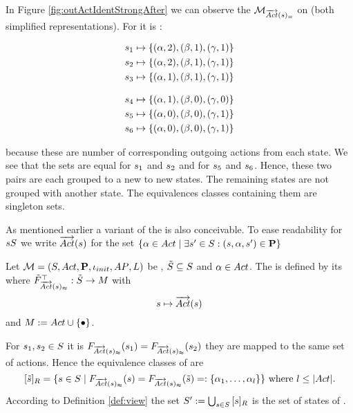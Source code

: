 \documentclass[preview]{standalone}
\begin{document}
In Figure \ref{fig:outActIdentStrongAfter} we can observe the \viewN ${{{{{\mathcal{M}}}}_{{{\overrightarrow{{Act}}}({s})_=}}}}$ on \mdp (both simplified representations). 
For \viewstrongoutactident it is \gfctstrongoutactident :

\begin{minipage}{.45\textwidth}
\begin{align*}
	{s}_1 &\mapsto \{({\alpha},2), ({\beta},1), ({\gamma},1)\} \\
	{s}_2 &\mapsto \{({\alpha},2), ({\beta},1), ({\gamma},1)\} \\
	{s}_3 &\mapsto \{({\alpha},1), ({\beta},1), ({\gamma},1)\} \\	
\end{align*}
\end{minipage}
\begin{minipage}{.55\textwidth}
\begin{align*}
	{s}_4 &\mapsto \{({\alpha},1), ({\beta},0), ({\gamma},0)\} \\
	{s}_5 &\mapsto \{({\alpha},0), ({\beta},0), ({\gamma},1)\} \\
	{s}_6 &\mapsto \{({\alpha},0), ({\beta},0), ({\gamma},1)\} \\
\end{align*}
\end{minipage}

because these are number of corresponding outgoing actions from each state. We see that the sets are equal for ${s}_1$ and ${s}_2$ and for ${s}_5$ and ${s}_6$. Hence, these two pairs are each grouped to a new to new states. The remaining states are not grouped with another state. The equivalences classes containing them are singleton sets.

As mentioned earlier a \outactidentweak variant of the \outactident \viewN is also conceivable. To ease readability for ${s} {S}$ we write ${\overrightarrow{{Act}}}({s})$ for the set $\{{\alpha} \in {Act} \mid \exists {s}' \in {S} : ({s}, {\alpha}, {s}') \in {\ensuremath{{\textbf{P}}}}\}$

\begin{definition}
	Let ${{{\mathcal{M}}}} = {{({S}, {Act}, {\textbf{P}}, {\iota_{init}}, {AP}, {L})}}$ be \achgphN, ${\tilde{{S}}} \subseteq {S}$ and ${\alpha} \in {Act}$. The \viewN \viewweakoutactident is defined by its \grpfctN \gfctweakoutactident where ${{\tilde{F}_{{{\overrightarrow{{Act}}}({s})_\approx}}}^{\top}} : {\tilde{{S}}} \to {\ensuremath{{M}}}$ with
	\[
	{s} \mapsto {\overrightarrow{\ensuremath{{Act}}}}({s})
	\]
	and $\imggrp := \actions \cup \remset$.
\end{definition}

For ${s}_1, {s}_2 \in {S}$ it is ${{F_{{{\overrightarrow{{Act}}}({s})_\approx}}}}({s}_1) = {{F_{{{\overrightarrow{{Act}}}({s})_\approx}}}}({s}_2)$ \iffN they are mapped to the same set of actions. Hence the equivalence classes of \eqrelview are
\[
	{{[{\tilde{{s}}}]_{{R}}}} = \{ {s} \in {S} \mid {\ensuremath{{F_{{{\overrightarrow{{Act}}}({s})_\approx}}}}}({s}) = {{F_{{{\overrightarrow{{Act}}}({s})_\approx}}}}({\tilde{{s}}}) =: \{{\alpha}_1, \dots, {\alpha}_l\}\} \text{  where } l \leq |{Act}|.
\]
According to Definition \ref{def:view} the set ${S}' := \bigcup_{{s} \in {S}} {{[{s}]_{{R}}}}$ is the set of states of \viewweakoutactident.
\end{document}

